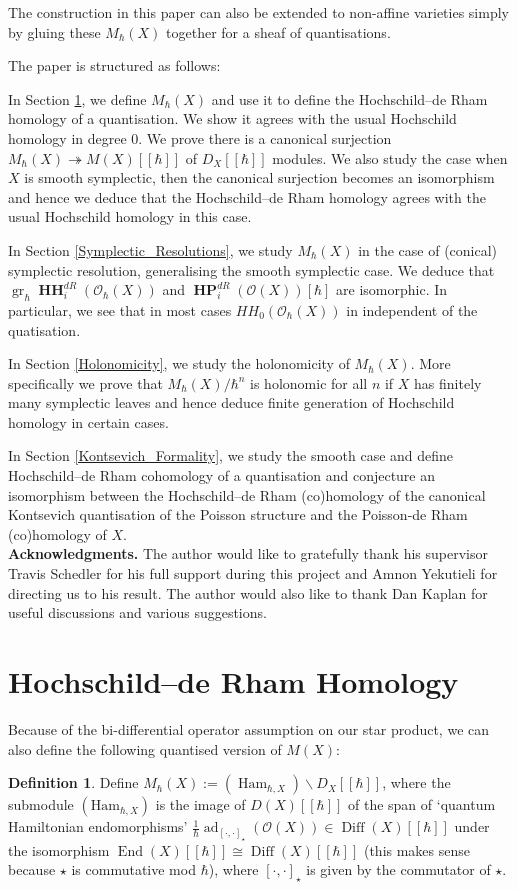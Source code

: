\documentclass[draft]{article}
\theoremstyle{definition}
\newtheorem{definition}[theorem]{Definition}
\DeclareMathOperator{\End}{{End}}
\DeclareMathOperator{\Diff}{{Diff}}
\DeclareMathOperator{\Ham}{{Ham}}
\DeclareMathOperator{\ad}{ad}
\DeclareMathOperator{\gr}{gr}
\DeclareMathOperator{\HH}{\mathbf{HH}}
\DeclareMathOperator{\HP}{\mathbf{HP}}
\newcommand{\doubleh}{[\![ \hbar ]\!]}
\newcommand{\OhX}{\mathcal{O}_\hbar(X)}
\newcommand{\MXh}{M(X)\doubleh}
\newcommand{\MhX}{M_\hbar(X)}
\begin{document}
The construction in this paper can also be extended to non-affine varieties simply by gluing these $\MhX$ together for a sheaf of quantisations. 

The paper is structured as follows:

In Section \ref{definition}, we define $\MhX$ and use it to define the Hochschild--de Rham homology of a quantisation. We show it agrees with the usual Hochschild homology in degree 0. We prove there is a canonical surjection $\MhX\twoheadrightarrow \MXh$ of $D_X\doubleh$ modules. We also study the case when $X$ is smooth symplectic, then the canonical surjection becomes an isomorphism and hence we deduce that the Hochschild--de Rham homology agrees with the usual Hochschild homology in this case. 

In Section \ref{Symplectic_Resolutions}, we study $\MhX$ in the case of (conical) symplectic resolution, generalising the smooth symplectic case. We deduce that $\gr_\hbar\HH^{dR}_i(\OhX)$ and $\HP^{dR}_i(\mathcal{O}(X))[\hbar]$ are isomorphic. In particular, we see that in most cases $HH_0(\OhX)$ in independent of the quatisation. 

In Section \ref{Holonomicity}, we study the holonomicity of $\MhX$. More specifically we prove that $\MhX/\hbar^n$ is holonomic for all $n$ if $X$ has finitely many symplectic leaves and hence deduce finite generation of Hochschild homology in certain cases.

In Section \ref{Kontsevich_Formality}, we study the smooth case and define Hochschild--de Rham cohomology of a quantisation and conjecture an isomorphism between the Hochschild--de Rham (co)homology of the canonical Kontsevich quantisation of the Poisson structure and the Poisson-de Rham (co)homology of $X$.\\

\textbf{Acknowledgments.} The author would like to gratefully thank his supervisor Travis Schedler for his full support during this project and Amnon Yekutieli for directing us to his result. The author would also like to thank Dan Kaplan for useful discussions and various suggestions. 

\section{Hochschild--de Rham Homology}\label{definition}

Because of the bi-differential operator assumption on our star product, we can also define the following quantised version of $M(X)$:
\begin{definition}
Define $M_\hbar(X):=(\Ham_{\hbar,X})\backslash D_X\doubleh$, where the submodule $(\text{Ham}_{\hbar,X})$ is the image of $D(X)\doubleh$ of the span of `quantum Hamiltonian endomorphisms' $\frac{1}{\hbar}\ad_{[\cdot,\cdot]_\star}(\mathcal{O}(X))\in \Diff(X)\doubleh$ under the isomorphism $\End(X)\doubleh\cong\Diff(X)\doubleh$ (this makes sense because $\star$ is commutative mod $\hbar$), where ${[\cdot,\cdot]_\star}$ is given by the commutator of $\star$.
\end{definition}
\end{document}
